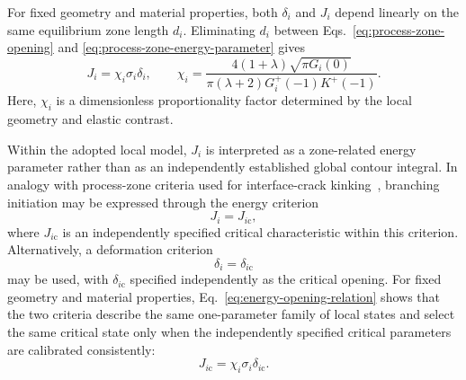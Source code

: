 For fixed geometry and material properties, both $\delta_i$ and $J_i$
depend linearly on the same equilibrium zone length $d_i$. Eliminating
$d_i$ between Eqs.~\eqref{eq:process-zone-opening} and
\eqref{eq:process-zone-energy-parameter} gives
\begin{equation}
\label{eq:energy-opening-relation}
  J_i=\chi_i\sigma_i\delta_i,
  \qquad
  \chi_i=
  \frac{4(1+\lambda)\sqrt{\pi G_i(0)}}
  {\pi(\lambda+2)G_i^+(-1)K^+(-1)}.
\end{equation}
Here, $\chi_i$ is a dimensionless proportionality factor determined by
the local geometry and elastic contrast.

Within the adopted local model, $J_i$ is interpreted as a zone-related
energy parameter rather than as an independently established global contour
integral. In analogy with process-zone criteria used for interface-crack
kinking~\cite{KaminskyEtAl2023}, branching initiation may be expressed
through the energy criterion
\begin{equation*}
  J_i=J_{i\mathrm{c}},
\end{equation*}
where $J_{i\mathrm{c}}$ is an independently specified critical
characteristic within this criterion. Alternatively, a deformation criterion
\begin{equation*}
  \delta_i=\delta_{i\mathrm{c}}
\end{equation*}
may be used, with $\delta_{i\mathrm{c}}$ specified independently as the
critical opening. For fixed geometry and material properties,
Eq.~\eqref{eq:energy-opening-relation} shows that the two criteria
describe the same one-parameter family of local states and select the
same critical state only when the independently specified critical
parameters are calibrated consistently:
\begin{equation*}
  J_{i\mathrm{c}}
  =\chi_i\sigma_i\delta_{i\mathrm{c}}.
\end{equation*}
